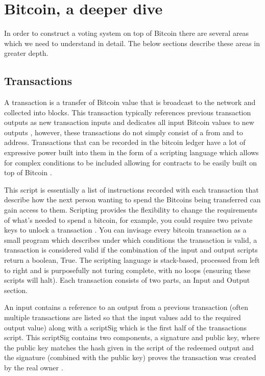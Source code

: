 \documentclass{article}
\begin{document}
    \section{Bitcoin, a deeper dive}
    In order to construct a voting system on top of Bitcoin there are several areas which we need to understand in detail. The below sections describe these areas in greater depth.
    
    \subsection{Transactions}
   
A transaction is a transfer of Bitcoin value that is broadcast to the network and collected into blocks. This transaction typically references previous transaction outputs as new transaction inputs and dedicates all input Bitcoin values to new outputs \citep{30_transactions_-_bitcoin_wiki_2016}, however, these transactions do not simply consist of a from and to address. Transactions that can be recorded in the bitcoin ledger have a lot of expressive power built into them in the form of a scripting language which allows for complex conditions to be included allowing for contracts to be easily built on top of Bitcoin \citep{29_wenger_2013}.

This script is essentially a list of instructions recorded with each transaction that describe how the next person wanting to spend the Bitcoins being transferred can gain access to them. Scripting provides the flexibility to change the requirements of what's needed to spend a bitcoin, for example, you could require two private keys to unlock a transaction \citep{31_script_-_bitcoin_wiki_2016}. You can invisage every bitcoin transaction as a small program which describes under which conditions the transaction is valid, a transaction is considered valid if the combination of the input and output scripts return a boolean, True. The scripting language is stack-based, processed from left to right and is purposefully not turing complete, with no loops (ensuring these scripts will halt). Each transaction consists of two parts, an Input and Output section.

An input contains a reference to an output from a previous transaction (often multiple transactions are listed so that the input values add to the required output value) along with a scriptSig which is the first half of the transactions script. This scriptSig contains two components, a signature and public key, where the public key matches the hash given in the script of the redeemed output and the signature (combined with the public key) proves the transaction was created by the real owner \citep{30_transactions_-_bitcoin_wiki_2016}.
\end{document}

